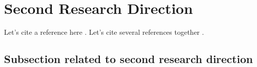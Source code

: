 
\section{Second Research Direction}
\label{sec-second}

\lipsum[2-4]
Let's cite a reference here \cite{Bayatpour2020}. Let's cite several references together \cite{Bayatpour2020, Chu2020, Li2020, nvidiaweb}. 

\subsection{Subsection related to second research direction}

\lipsum[1-1]